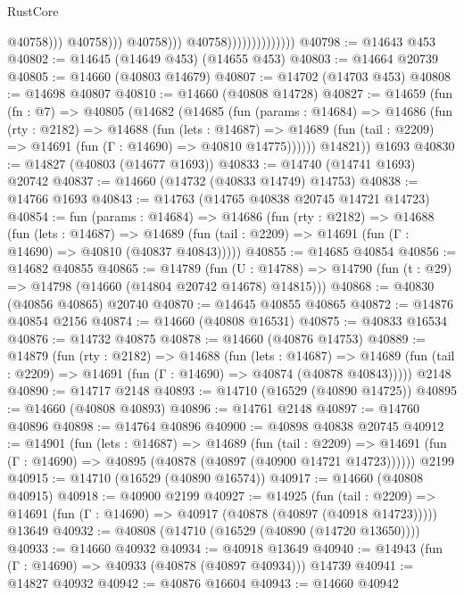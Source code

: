 \begin{lexlean}{RustCore}
\begin{coremodule}
                                                  @40758)))
                                            @40758)))
                                      @40758)))
                                @40758))))))))))))))
@40798 := @14643 @453
@40802 := @14645 (@14649 @453) (@14655 @453)
@40803 := @14664 @20739
@40805 := @14660 (@40803 @14679)
@40807 := @14702 (@14703 @453)
@40808 := @14698 @40807
@40810 := @14660 (@40808 @14728)
@40827 := @14659
    (fun (fn : @7) =>
    @40805
      (@14682
        (@14685
          (fun (params : @14684) =>
          @14686
            (fun (rty : @2182) =>
            @14688
              (fun (lets : @14687) =>
              @14689 (fun (tail : @2209) => @14691 (fun (Γ : @14690) => @40810 @14775))))))
        @14821))
    @1693
@40830 := @14827 (@40803 (@14677 @1693))
@40833 := @14740 (@14741 @1693) @20742
@40837 := @14660 (@14732 (@40833 @14749) @14753)
@40838 := @14766 @1693
@40843 := @14763 (@14765 @40838 @20745 @14721 @14723)
@40854 := fun (params : @14684) =>
  @14686
    (fun (rty : @2182) =>
    @14688
      (fun (lets : @14687) =>
      @14689 (fun (tail : @2209) => @14691 (fun (Γ : @14690) => @40810 (@40837 @40843)))))
@40855 := @14685 @40854
@40856 := @14682 @40855
@40865 := @14789
    (fun (U : @14788) => @14790 (fun (t : @29) => @14798 (@14660 (@14804 @20742 @14678) @14815)))
@40868 := @40830 (@40856 @40865) @20740
@40870 := @14645 @40855 @40865
@40872 := @14876 @40854 @2156
@40874 := @14660 (@40808 @16531)
@40875 := @40833 @16534
@40876 := @14732 @40875
@40878 := @14660 (@40876 @14753)
@40889 := @14879
    (fun (rty : @2182) =>
    @14688
      (fun (lets : @14687) =>
      @14689 (fun (tail : @2209) => @14691 (fun (Γ : @14690) => @40874 (@40878 @40843)))))
    @2148
@40890 := @14717 @2148
@40893 := @14710 (@16529 (@40890 @14725))
@40895 := @14660 (@40808 @40893)
@40896 := @14761 @2148
@40897 := @14760 @40896
@40898 := @14764 @40896
@40900 := @40898 @40838 @20745
@40912 := @14901
    (fun (lets : @14687) =>
    @14689
      (fun (tail : @2209) =>
      @14691 (fun (Γ : @14690) => @40895 (@40878 (@40897 (@40900 @14721 @14723))))))
    @2199
@40915 := @14710 (@16529 (@40890 @16574))
@40917 := @14660 (@40808 @40915)
@40918 := @40900 @2199
@40927 := @14925
    (fun (tail : @2209) => @14691 (fun (Γ : @14690) => @40917 (@40878 (@40897 (@40918 @14723)))))
    @13649
@40932 := @40808 (@14710 (@16529 (@40890 (@14720 @13650))))
@40933 := @14660 @40932
@40934 := @40918 @13649
@40940 := @14943 (fun (Γ : @14690) => @40933 (@40878 (@40897 @40934))) @14739
@40941 := @14827 @40932
@40942 := @40876 @16604
@40943 := @14660 @40942

\end{coremodule}
\end{lexlean}
